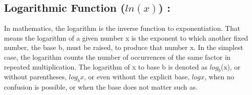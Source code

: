 \documentclass[12pt,a4paper]{article}
\begin{document}
\subsection{Logarithmic Function ($ln(x)$) :}
In mathematics, the logarithm is the inverse function to exponentiation. That means the logarithm of a given number x is the exponent to which another fixed number, the base b, must be raised, to produce that number x. In the simplest case, the logarithm counts the number of occurrences of the same factor in repeated multiplication. The logarithm of x to base b is denoted as $log_b$(x), or without parentheses, $log_b x$, or even without the explicit base, $log x$, when no confusion is possible, or when the base does not matter such as.
\end{document}
